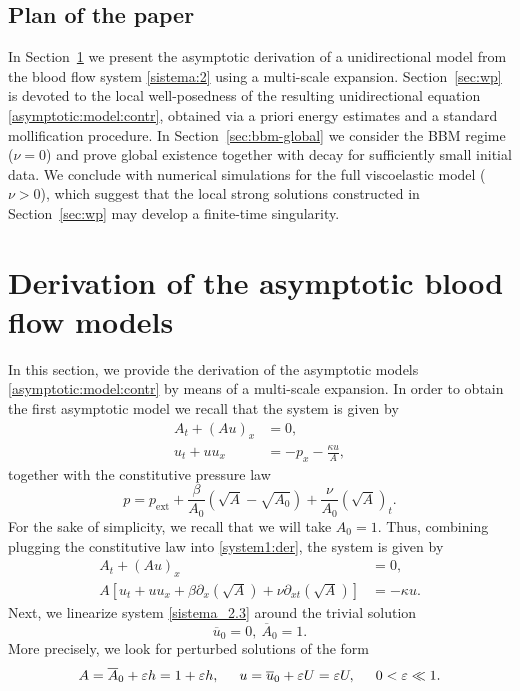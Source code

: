 \documentclass[reqno]{amsart}
\theoremstyle{definition}
\numberwithin{equation}{section}
\numberwithin{theorem}{section}
\numberwithin{definition}{section}
\begin{document}
\subsection{Plan of the paper}
In Section~\ref{sec:derivation} we present the asymptotic derivation of a unidirectional model from the blood flow system
\eqref{sistema:2} using a multi-scale expansion. Section~\ref{sec:wp} is devoted to the local well-posedness of the resulting
unidirectional equation \eqref{asymptotic:model:contr}, obtained via a priori energy estimates and a standard mollification
procedure. In Section~\ref{sec:bbm-global} we consider the BBM regime ($\nu=0$) and prove global existence together with decay
for sufficiently small initial data. We conclude with numerical simulations for the full viscoelastic model ($\nu>0$), which
suggest that the local strong solutions constructed in Section~\ref{sec:wp} may develop a finite-time singularity.






\section{Derivation of the asymptotic blood flow models}\label{sec:derivation}
In this section, we provide the derivation of the asymptotic models \eqref{asymptotic:model:contr} by means of a multi-scale expansion. In order to obtain the first asymptotic model we recall that the system is given by
\begin{subequations}\label{system1:der}
    \begin{align}
        A_t + (Au)_x &= 0,\\
        u_t + u u_x &= -p_x - \frac{\kappa u}{A},
    \end{align}
\end{subequations}
\noindent together with the constitutive pressure law
\begin{equation*}
    p = p_{\text{ext}} + \frac{\beta}{A_0}\left(\sqrt{A} - \sqrt{A_0}\right) + \frac{\nu}{A_0}(\sqrt{A})_t.
\end{equation*}
For the sake of simplicity, we recall that we will take $A_0 = 1$. Thus, combining plugging the constitutive law into \eqref{system1:der}, the system is given by
\begin{subequations}\label{sistema_2.3}
    \begin{align}
        A_t + (Au)_x &=0,\\
   A\left[ u_t +uu_x + \beta \partial_x \left(\sqrt{A}\right) +  \nu \partial_{xt} \left(\sqrt{A}\right)\right]&=-{\kappa u}.
    \end{align}
\end{subequations}
Next, we linearize system \eqref{sistema_2.3} around the trivial solution \[\overline{u}_0=0,\ \overline{A}_0=1.\] More precisely, we look for perturbed solutions of the form
\begin{equation}\label{soluciones_cerca_triviales}
    A = \overline{A}_0 + \varepsilon h = 1+\varepsilon  h,\hspace{5mm} u= \overline{u}_0 + \varepsilon U = \varepsilon U,\hspace{5mm} 0<\varepsilon\ll 1.
\end{equation}
\end{document}
